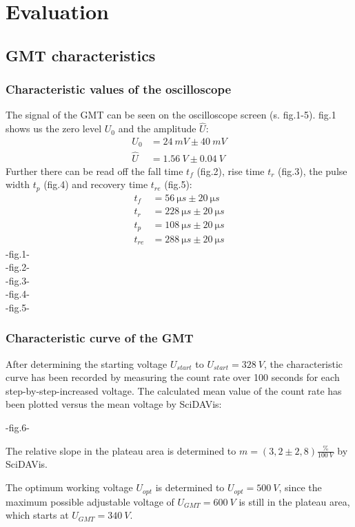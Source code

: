 \chapter{Evaluation}
%
\section{GMT characteristics}
%
\subsection{Characteristic values of the oscilloscope}
%
The signal of the GMT can be seen on the oscilloscope screen (s. fig.1-5). fig.1 shows us the zero level \(U_{0}\) and
the amplitude \(\hat{U}\):
%
\begin{align}
    U_{0}   &=  \SI{24}{mV} \pm \SI{40}{mV} \\
    \hat{U} &=  \SI{1,56}{V} \pm \SI{0,04}{V}
\end{align}
%
Further there can be read off the fall time \(t_{f}\) (fig.2), rise time \(t_{r}\) (fig.3), the pulse width \(t_{p}\)
(fig.4) and recovery time \(t_{re}\) (fig.5):
\begin{align}
    t_{f}   &=  \SI{56}{\micro s} \pm \SI{20}{\micro s} \\
    t_{r}   &=  \SI{228}{\micro s} \pm \SI{20}{\micro s} \\
    t_{p}   &=  \SI{108}{\micro s} \pm \SI{20}{\micro s} \\
    t_{re}  &=  \SI{288}{\micro s} \pm \SI{20}{\micro s}
\end{align}
-fig.1-\\
-fig.2-\\
-fig.3-\\
-fig.4-\\
-fig.5-
%
\subsection{Characteristic curve of the GMT}
%
After determining the starting voltage \(U_{start}\) to \(U_{start}=\SI{328}{V}\), the characteristic curve has been
recorded by measuring the count rate over 100 seconds for each step-by-step-increased voltage. The calculated mean value
of the count rate has been plotted versus the mean voltage by SciDAVis:\par
-fig.6-\par
The relative slope in the plateau area is determined to \(m=(3,2 \pm 2,8) \frac{\%}{\SI{100}{V}}\) by SciDAVis.\par
The optimum working voltage \(U_{opt}\) is determined to \(U_{opt}=\SI{500}{V}\), since the maximum possible adjustable
voltage of \(U_{GMT}=\SI{600}{V}\) is still in the plateau area, which starts at \(U_{GMT}=\SI{340}{V}\).
%
